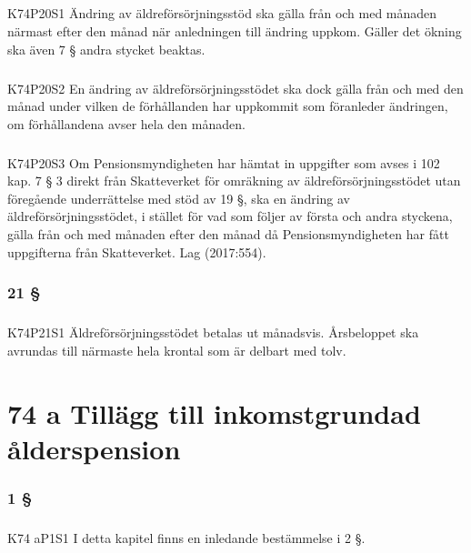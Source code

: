 \documentclass[a4paper,notitlepage,openany,10pt]{book}
\begin{document}
\paragraph*{}
{\tiny K74P20S1}
Ändring av äldreförsörjningsstöd ska gälla från och med månaden närmast efter den månad när anledningen till ändring uppkom. Gäller det ökning ska även 7 § andra stycket beaktas.
\paragraph*{}
{\tiny K74P20S2}
En ändring av äldreförsörjningsstödet ska dock gälla från och med den månad under vilken de förhållanden har uppkommit som föranleder ändringen, om förhållandena avser hela den månaden.
\paragraph*{}
{\tiny K74P20S3}
Om Pensionsmyndigheten har hämtat in uppgifter som avses i 102 kap. 7 § 3 direkt från Skatteverket för omräkning av äldreförsörjningsstödet utan föregående underrättelse med stöd av 19 §, ska en ändring av äldreförsörjningsstödet, i stället för vad som följer av första och andra styckena, gälla från och med månaden efter den månad då Pensionsmyndigheten har fått uppgifterna från Skatteverket.
Lag (2017:554).
\subsection*{21 §}
\paragraph*{}
{\tiny K74P21S1}
Äldreförsörjningsstödet betalas ut månadsvis.
Årsbeloppet ska avrundas till närmaste hela krontal som är delbart med tolv.
\chapter*{74 a Tillägg till inkomstgrundad ålderspension}
\subsection*{1 §}
\paragraph*{}
{\tiny K74 aP1S1}
I detta kapitel finns en inledande bestämmelse i 2 §.
\end{document}
